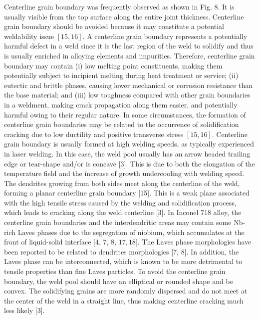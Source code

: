\documentclass[10pt]{article}
\begin{document}
Centerline grain boundary was frequently observed as shown in Fig. 8. It is usually visible from the top surface along the entire joint thickness. Centerline grain boundary should be avoided because it may constitute a potential weldability issue $[15,16]$. A centerline grain boundary represents a potentially harmful defect in a weld since it is the last region of the weld to solidify and thus is usually enriched in alloying elements and impurities. Therefore, centerline grain boundary may contain (i) low melting point constituents, making them potentially subject to incipient melting during heat treatment or service; (ii) eutectic and brittle phases, causing lower mechanical or corrosion resistance than the base material; and (iii) low toughness compared with other grain boundaries in a weldment, making crack propagation along them easier, and potentially harmful owing to their regular nature. In some circumstances, the formation of centerline grain boundaries may be related to the occurrence of solidification cracking due to low ductility and positive transverse stress $[15,16]$. Centerline grain boundary is usually formed at high welding speeds, as typically experienced in laser welding. In this case, the weld pool usually has an arrow headed trailing edge or tear-shape and/or is concave [3]. This is due to both the elongation of the temperature field and the increase of growth undercooling with welding speed. The dendrites growing from both sides meet along the centerline of the weld, forming a planar centerline grain boundary [15]. This is a weak plane associated with the high tensile stress caused by the welding and solidification process, which leads to cracking along the weld centerline [3]. In Inconel 718 alloy, the centerline grain boundaries and the interdendritic areas may contain some Nb-rich Laves phases due to the segregation of niobium, which accumulates at the front of liquid-solid interface [4, 7, 8, $17,18]$. The Laves phase morphologies have been reported to be related to dendrites morphologies [7, 8]. In addition, the Laves phase can be interconnected, which is known to be more detrimental to tensile properties than fine Laves particles. To avoid the centerline grain boundary, the weld pool should have an elliptical or rounded shape and be convex. The solidifying grains are more randomly dispersed and do not meet at the center of the weld in a straight line, thus making centerline cracking much less likely [3].
\end{document}
